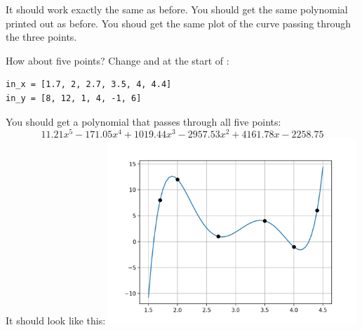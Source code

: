 It should work exactly the same as before.  You should get the same
polynomial printed out as before. You shoud get the same plot of the
curve passing through the three points.

How about five points? Change  and  at the
start of :
\begin{Verbatim}
in_x = [1.7, 2, 2.7, 3.5, 4, 4.4]
in_y = [8, 12, 1, 4, -1, 6]
\end{Verbatim}

You should get a polynomial that passes through all five points:
\begin{equation*}
11.21x^5 - 171.05x^4 + 1019.44x^3 - 2957.53x^2 + 4161.78x - 2258.75  
\end{equation*}
It should look like this:
\includegraphics[width=0.7\textwidth]{fiveinterp.png}
